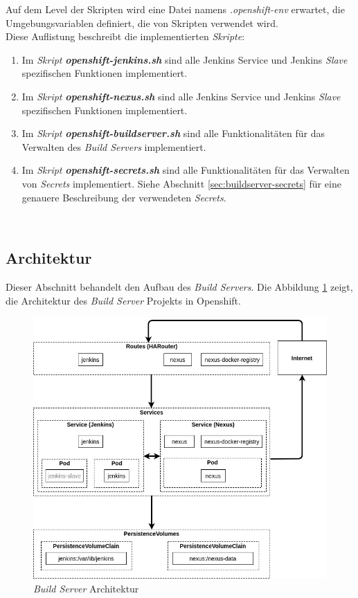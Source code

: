 Auf dem Level der Skripten wird eine Datei namens \emph{.openshift-env} erwartet, die Umgebungsvariablen definiert, die von Skripten verwendet wird.\\

Diese Auflistung beschreibt die implementierten \emph{Skripte}:
\begin{enumerate}
	\item Im \emph{Skript} \textbf{\emph{openshift-jenkins.sh}} sind alle Jenkins Service und Jenkins \emph{Slave} spezifischen Funktionen implementiert.
	\item Im \emph{Skript} \textbf{\emph{openshift-nexus.sh}} sind alle Jenkins Service und Jenkins \emph{Slave} spezifischen Funktionen implementiert.
	\item Im \emph{Skript} \textbf{\emph{openshift-buildserver.sh}} sind alle Funktionalitäten für das Verwalten des \emph{Build Servers} implementiert.
	\item Im \emph{Skript} \textbf{\emph{openshift-secrets.sh}} sind alle Funktionalitäten für das Verwalten von \emph{Secrets} implementiert. Siehe Abschnitt \ref{sec:buildserver-secrets} für eine genauere Beschreibung der verwendeten \emph{Secrets}.
\end{enumerate}

\ \subsection{Architektur}
Dieser Abschnitt behandelt den Aufbau des \emph{Build Servers}. Die Abbildung \ref{fig:architecture} zeigt, die Architektur des \emph{Build Server} Projekts in Openshift.
\begin{figure}[H]
	\centering
	\includegraphics[scale=0.6]{logos/architecture-diagram.jpg}
	\caption{\emph{Build Server} Architektur}
	\label{fig:architecture}
\end{figure}


